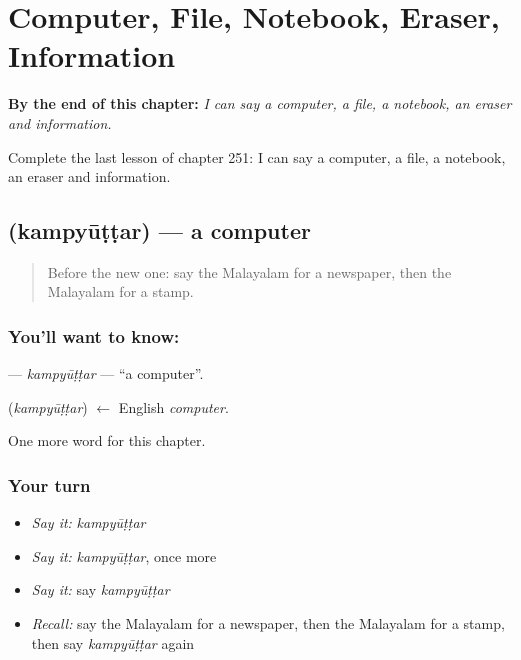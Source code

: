 
\chapter{Computer, File, Notebook, Eraser, Information}
\label{ch:ml-computer-file-notebook-eraser-information}

\begin{chapteropening}
\textbf{By the end of this chapter:} \emph{I can say a computer, a file, a notebook, an eraser and information.}

Complete the last lesson of chapter 251: I can say a computer, a file, a notebook, an eraser and information.
\end{chapteropening}

\section[\texorpdfstring{\ml{കമ്പ്യൂട്ടർ} (kampyūṭṭar)}{കമ്പ്യൂട്ടർ (kampyūṭṭar)}]{ (kampyūṭṭar) — a computer}

\label{lesson:ML-C251-kampyuttar}



\begin{quote}
Before the new one: say the Malayalam for a newspaper, then the Malayalam for a stamp.
\end{quote}

\subsection*{You'll want to know: }
\textbf{} — \emph{kampyūṭṭar} — \textquotedblleft{}a computer\textquotedblright{}.

\begin{cousinweb}
\textbf{} (\emph{kampyūṭṭar}) $\leftarrow$ English \emph{computer}.
\end{cousinweb}

\begin{grammarlens}[title={What you've built}]
One more word for this chapter.
\end{grammarlens}

\subsection*{Your turn}
\begin{itemize}
\raggedright
  \item \emph{Say it:} \emph{kampyūṭṭar}
  \item \emph{Say it:} \emph{kampyūṭṭar}, once more
  \item \emph{Say it:} say \emph{kampyūṭṭar}
  \item \emph{Recall:} say the Malayalam for a newspaper, then the Malayalam for a stamp, then say \emph{kampyūṭṭar} again
\end{itemize}

